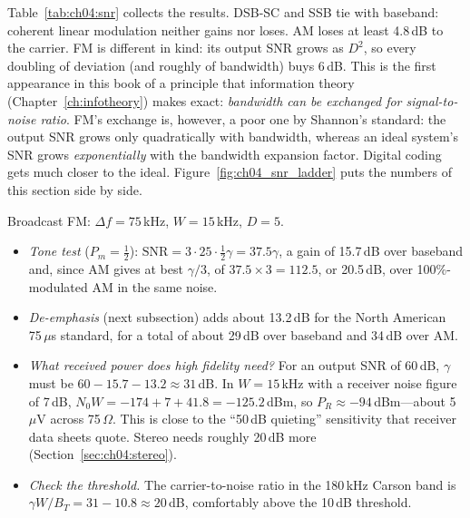 Table~\ref{tab:ch04:snr} collects the results. DSB-SC and SSB tie with baseband: coherent linear modulation
neither gains nor loses. AM loses at least 4.8\,dB to the carrier. FM is different in kind: its output SNR
grows as $D^2$, so every doubling of deviation (and roughly of bandwidth) buys 6\,dB. This is the first
appearance in this book of a principle that information theory (Chapter~\ref{ch:infotheory}) makes exact:
\emph{bandwidth can be exchanged for signal-to-noise ratio}. FM's exchange is, however, a poor one by
Shannon's standard: the output SNR grows only quadratically with bandwidth, whereas an ideal system's SNR
grows \emph{exponentially} with the bandwidth expansion factor. Digital coding gets much closer to the ideal.
Figure~\ref{fig:ch04_snr_ladder} puts the numbers of this section side by side.


\begin{worked}
Broadcast FM: $\Delta f=75$\,kHz, $W=15$\,kHz, $D=5$.
\begin{itemize}
\item \emph{Tone test} ($P_m=\frac12$): $\text{SNR}=3\cdot25\cdot\frac12\gamma=37.5\gamma$, a gain of 15.7\,dB
over baseband and, since AM gives at best $\gamma/3$, of $37.5\times3=112.5$, or 20.5\,dB, over
100\%-modulated AM in the same noise.
\item \emph{De-emphasis} (next subsection) adds about 13.2\,dB for the North American 75\,$\mu$s standard,
for a total of about 29\,dB over baseband and 34\,dB over AM.
\item \emph{What received power does high fidelity need?} For an output SNR of 60\,dB, $\gamma$ must be
$60-15.7-13.2\approx31$\,dB. In $W=15$\,kHz with a receiver noise figure of 7\,dB,
$N_0W=-174+7+41.8=-125.2$\,dBm, so $P_R\approx-94$\,dBm---about 5\,$\mu$V across 75\,$\Omega$. This is close
to the ``50\,dB quieting'' sensitivity that receiver data sheets quote. Stereo needs roughly 20\,dB more
(Section~\ref{sec:ch04:stereo}).
\item \emph{Check the threshold.} The carrier-to-noise ratio in the 180\,kHz Carson band is
$\gamma W/B_T=31-10.8\approx20$\,dB, comfortably above the 10\,dB threshold.
\end{itemize}
\end{worked}

